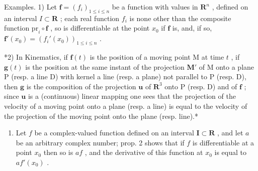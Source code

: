 Examples. 1) Let \(\mathbf{f} = (f_i)_{1\leqslant i\leqslant n}\) be a function with values in \(\mathbf{R}^n\) , defined on an interval \(I\subset \mathbf{R}\) ; each real function \(f_{i}\) is none other than the composite function \(\mathrm{pr}_i\circ \mathbf{f}\) , so is differentiable at the point \(x_0\) if \(\mathbf{f}\) is, and, if so, \(\mathbf{f}'(x_0) = (f_i'(x_0))_{1\leqslant i\leqslant n}\) .

*2) In Kinematics, if \(\mathbf{f}(t)\) is the position of a moving point M at time \(t\) , if \(\mathbf{g}(t)\) is the position at the same instant of the projection \(\mathbf{M}'\) of M onto a plane P (resp. a line D) with kernel a line (resp. a plane) not parallel to P (resp. D), then \(\mathbf{g}\) is the composition of the projection \(\mathbf{u}\) of \(\mathbf{R}^3\) onto P (resp. D) and of \(\mathbf{f}\) ; since \(\mathbf{u}\) is a (continuous) linear mapping one sees that the projection of the velocity of a moving point onto a plane (resp. a line) is equal to the velocity of the projection of the moving point onto the plane (resp. line).*

\begin{enumerate}
\def\labelenumi{\arabic{enumi})}
\setcounter{enumi}{2}
\tightlist
\item
  Let \(f\) be a complex-valued function defined on an interval \(\mathbf{I} \subset \mathbf{R}\) , and let \(a\) be an arbitrary complex number; prop. 2 shows that if \(f\) is differentiable at a point \(x_0\) then so is \(af\) , and the derivative of this function at \(x_0\) is equal to \(af'(x_0)\) .
\end{enumerate}

